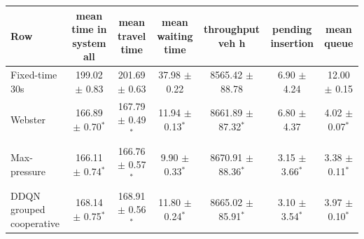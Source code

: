 \begin{tabular}{lcccccc}
\toprule
Row & mean time in system all & mean travel time & mean waiting time & throughput veh h & pending insertion & mean queue \\
\midrule
Fixed-time 30s & 199.02 $\pm$ 0.83 & 201.69 $\pm$ 0.63 & 37.98 $\pm$ 0.22 & 8565.42 $\pm$ 88.78 & 6.90 $\pm$ 4.24 & 12.00 $\pm$ 0.15 \\
Webster & 166.89 $\pm$ 0.70$^{*}$ & 167.79 $\pm$ 0.49$^{*}$ & 11.94 $\pm$ 0.13$^{*}$ & 8661.89 $\pm$ 87.32$^{*}$ & 6.80 $\pm$ 4.37 & 4.02 $\pm$ 0.07$^{*}$ \\
Max-pressure & 166.11 $\pm$ 0.74$^{*}$ & 166.76 $\pm$ 0.57$^{*}$ & 9.90 $\pm$ 0.33$^{*}$ & 8670.91 $\pm$ 88.36$^{*}$ & 3.15 $\pm$ 3.66$^{*}$ & 3.38 $\pm$ 0.11$^{*}$ \\
DDQN grouped cooperative & 168.14 $\pm$ 0.75$^{*}$ & 168.91 $\pm$ 0.56$^{*}$ & 11.80 $\pm$ 0.24$^{*}$ & 8665.02 $\pm$ 85.91$^{*}$ & 3.10 $\pm$ 3.54$^{*}$ & 3.97 $\pm$ 0.10$^{*}$ \\
\bottomrule
\end{tabular}
